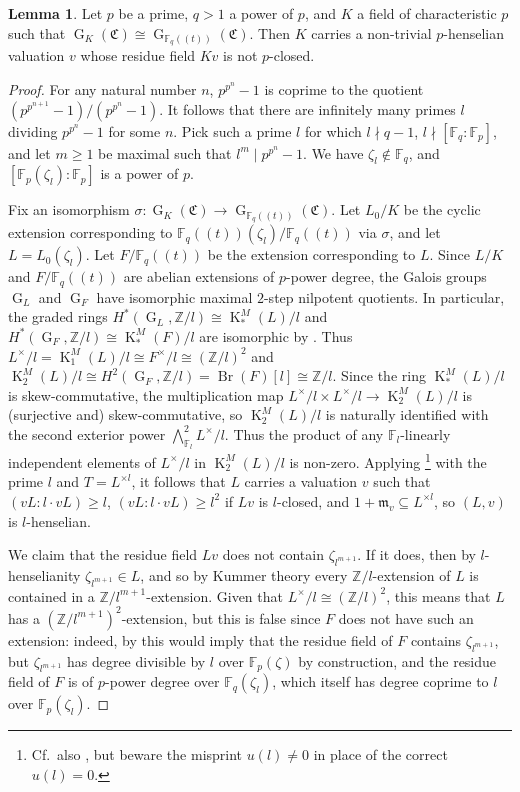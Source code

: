 \documentclass[a4paper, british, oneside]{amsart}
\newcommand{\Z}{\mathbb{Z}}
\newcommand{\F}{\mathbb{F}}
\DeclareMathOperator{\G}{G}
\DeclareMathOperator{\Br}{Br}
\newcommand{\pow}[1]{(\!(#1)\!)}
\newcommand{\KM}{\operatorname{K}^M}
\theoremstyle{definition}
\newtheorem{lemma}[theorem]{Lemma}
\theoremstyle{remark}
\begin{document}
\begin{lemma}\label{lem:val-exists-sharpened}
  Let $p$ be a prime, $q > 1$ a power of $p$, and
  $K$ a field of characteristic $p$
  such that $\G_K(\mathfrak{C}) \cong \G_{\F_q\pow{t}}(\mathfrak{C})$.
  Then $K$ carries a non-trivial $p$-henselian valuation $v$ whose residue field $Kv$ is not $p$-closed.
\end{lemma}
\begin{proof}
  For any natural number $n$, $p^{p^n}-1$ is coprime to the quotient $(p^{p^{n+1}}-1)/(p^{p^n}-1)$.
  It follows that there are infinitely many primes $l$ dividing $p^{p^n}-1$ for some $n$.
  Pick such a prime $l$ for which $l \nmid q-1$, $l \nmid [\F_q : \F_p]$,
  and let $m \geq 1$ be maximal such that $l^m \mid p^{p^n}-1$.
  We have $\zeta_l \not\in \F_q$,
  and $[\F_p(\zeta_l) : \F_p]$ is a power of $p$.

  Fix an isomorphism $\sigma \colon \G_K(\mathfrak{C}) \to \G_{\F_q\pow{t}}(\mathfrak{C})$.
  Let $L_0/K$ be the cyclic extension corresponding to $\F_q\pow{t}(\zeta_l)/\F_q\pow{t}$ via $\sigma$,
  and let $L = L_0(\zeta_l)$.
  Let $F/\F_q\pow{t}$ be the extension corresponding to $L$.
  Since $L/K$ and $F/\F_q\pow{t}$ are abelian extensions of $p$-power degree,
  the Galois groups $\G_L$ and $\G_F$ have isomorphic maximal $2$-step nilpotent quotients.
  In particular, the graded rings $H^\ast(\G_L, \Z/l) \cong \KM_\ast(L)/l$ and $H^\ast(\G_F, \Z/l) \cong \KM_\ast(F)/l$ are isomorphic by \cite[Theorem A]{CheboluEfratMinac_QuotientsDetermineCohomology}.
  Thus $L^\times/l = \KM_1(L)/l \cong F^\times/l \cong (\Z/l)^2$ and $\KM_2(L)/l \cong H^2(\G_F, \Z/l) = \Br(F)[l] \cong \Z/l$.
  Since the ring $\KM_\ast(L)/l$ is skew-commutative,
  the multiplication map $L^\times/l \times L^\times/l \to \KM_2(L)/l$ is (surjective and) skew-commutative,
  so $\KM_2(L)/l$ is naturally identified with the second exterior power $\bigwedge^2_{\F_l} L^\times/l$.
  Thus the product of any $\F_l$-linearly independent elements of $L^\times/l$ in $\KM_2(L)/l$ is non-zero.
  Applying \cite[Main Theorem]{Efrat_ConstructionValuations}\footnote{Cf.\
    also \cite[Theorem 2.1]{EfratFesenko},
    but beware the misprint $u(l) \neq 0$ in place of the correct $u(l) = 0$.}
  with the prime $l$ and $T = L^{\times l}$,
  it follows that $L$ carries a valuation $v$ such that
  $(vL : l \cdot vL) \geq l$, $(vL : l \cdot vL) \geq l^2$ if $Lv$ is $l$-closed,
  and $1 + \mathfrak{m}_v \subseteq L^{\times l}$, so $(L,v)$ is $l$-henselian.

  We claim that the residue field $Lv$ does not contain $\zeta_{l^{m+1}}$.
  If it does, then by $l$-henselianity $\zeta_{l^{m+1}} \in L$,
  and so by Kummer theory every $\Z/l$-extension of $L$ is contained in a $\Z/l^{m+1}$-extension.
  Given that $L^\times/l \cong (\Z/l)^2$, this means that $L$ has a $(\Z/l^{m+1})^2$-extension,
  but this is false since $F$ does not have such an extension:
  indeed, by \cite[Proposition 7.5.9]{NSW} this would imply that the residue field of $F$ contains $\zeta_{l^{m+1}}$, but $\zeta_{l^{m+1}}$ has degree divisible by $l$ over $\F_p(\zeta)$ by construction, and the residue field of $F$ is of $p$-power degree over $\F_q(\zeta_l)$, which itself has degree coprime to $l$ over $\F_p(\zeta_l)$.


\end{proof}
\end{document}
